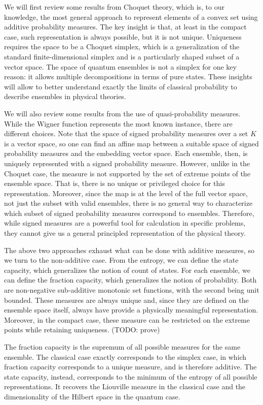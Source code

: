 \documentclass[10pt,twocolumn, nofootinbib]{revtex4-2}
\begin{document}
We will first review some results from Choquet theory, which is, to our knowledge, the most general approach to represent elements of a convex set using additive probability measures. The key insight is that, at least in the compact case, such representation is always possible, but it is not unique. Uniqueness requires the space to be a Choquet simplex, which is a generalization of the standard finite-dimensional simplex and is a particularly shaped subset of a vector space. The space of quantum ensembles is not a simplex for one key reason: it allows multiple decompositions in terms of pure states. These insights will allow to better understand exactly the limits of classical probability to describe ensembles in physical theories.

We will also review some results from the use of quasi-probability measures. While the Wigner function represents the most known instance, there are different choices. Note that the space of signed probability measures over a set $K$ is a vector space, so one can find an affine map between a suitable space of signed probability measures and the embedding vector space. Each ensemble, then, is uniquely represented with a signed probability measure. However, unlike in the Choquet case, the measure is not supported by the set of extreme points of the ensemble space. That is, there is no unique or privileged choice for this representation. Moreover, since the map is at the level of the full vector space, not just the subset with valid ensembles, there is no general way to characterize which subset of signed probability measures correspond to ensembles. Therefore, while signed measures are a powerful tool for calculation in specific problems, they cannot give us a general principled representation of the physical theory.

The above two approaches exhaust what can be done with additive measures, so we turn to the non-additive case. From the entropy, we can define the state capacity, which generalizes the notion of count of states. For each ensemble, we can define the fraction capacity, which generalizes the notion of probability. Both are non-negative sub-additive monotonic set functions, with the second being unit bounded. These measures are always unique and, since they are defined on the ensemble space itself, always have provide a physically meaningful representation. Moreover, in the compact case, these measure can be restricted on the extreme points while retaining uniqueness. (TODO: prove)

The fraction capacity is the supremum of all possible measures for the same ensemble. The classical case exactly corresponds to the simplex case, in which fraction capacity corresponds to a unique measure, and is therefore additive. The state capacity, instead, corresponds to the minimum of the entropy of all possible representations. It recovers the Liouville measure in the classical case and the dimensionality of the Hilbert space in the quantum case.
\end{document}
